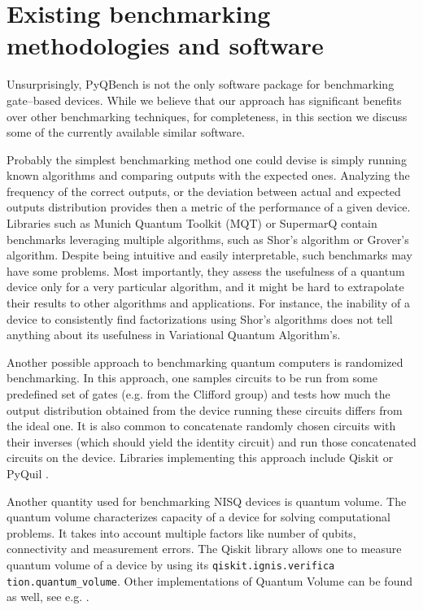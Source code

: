 \documentclass[preprint,12pt, a4paper, dvipsnames]{elsarticle}
\newcommand{\1}{{\rm 1\hspace{-0.9mm}l}}
\theoremstyle{definition}
\begin{document}
\section{Existing benchmarking methodologies and software}
Unsurprisingly, PyQBench is not the only software package for benchmarking gate--based devices.
While we believe that our approach has significant benefits over other benchmarking techniques, for
completeness, in this section we discuss some of the currently available similar software.

Probably the simplest benchmarking method one could devise is simply running known algorithms and
comparing outputs with the expected ones. Analyzing the frequency of the correct outputs, or the
deviation between actual and expected outputs distribution provides then a metric of the performance
of a given device. Libraries such as Munich Quantum Toolkit (MQT) \cite{mqt2022, mqt-bench} or
SupermarQ \cite{supermarq, supermarkq-github} contain benchmarks leveraging multiple algorithms,
such as Shor's algorithm or Grover's algorithm.
Despite being intuitive and easily interpretable, such benchmarks may have some problems. Most
importantly, they assess the usefulness of a quantum device only for a very particular algorithm,
and it might be hard to extrapolate their results to other algorithms and applications. For
instance, the inability of a device to consistently find factorizations using Shor's algorithms does
not tell anything about its usefulness in Variational Quantum Algorithm's.

Another possible approach to benchmarking quantum computers is randomized benchmarking. In this
approach, one samples circuits to be run from some predefined set of gates (e.g. from the Clifford
group) and tests how much the output distribution obtained from the device running these circuits
differs from the ideal one. It is also common to concatenate randomly chosen circuits with their
inverses (which should yield the identity circuit) and run those concatenated circuits on the
device. Libraries implementing this approach include Qiskit \cite{qiskit-randomized} or PyQuil
\cite{forest-benchmarking}.

Another quantity used for benchmarking NISQ devices is quantum volume. The quantum volume
characterizes capacity of a device for solving computational problems. It takes into account
multiple factors like number of qubits, connectivity and measurement errors. The Qiskit library
allows one to measure quantum volume of a device by using its \texttt{qiskit.ignis.verifica \\
tion.quantum\_volume}. Other implementations of Quantum Volume can be found as well, see e.g.
\cite{volume-in-practice}.
\end{document}

